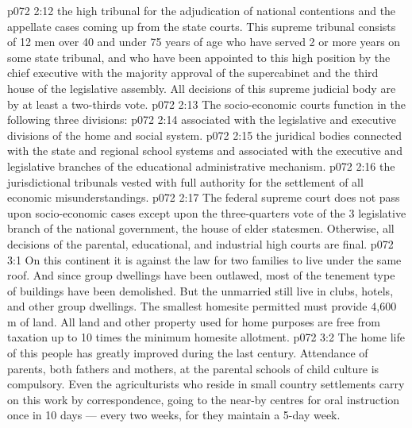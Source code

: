 \vs p072 2:12 \bibnobreakspace {} the high tribunal for the adjudication of national contentions and the appellate cases coming up from the state courts. This supreme tribunal consists of 12 men over 40 and under 75 years of age who have served 2 or more years on some state tribunal, and who have been appointed to this high position by the chief executive with the majority approval of the supercabinet and the third house of the legislative assembly. All decisions of this supreme judicial body are by at least a two\hyp{}thirds vote.
\vs p072 2:13 \pc The socio\hyp{}economic courts function in the following three divisions:
\vs p072 2:14 \bibnobreakspace {} associated with the legislative and executive divisions of the home and social system.
\vs p072 2:15 \bibnobreakspace {} the juridical bodies connected with the state and regional school systems and associated with the executive and legislative branches of the educational administrative mechanism.
\vs p072 2:16 \bibnobreakspace {} the jurisdictional tribunals vested with full authority for the settlement of all economic misunderstandings.
\vs p072 2:17 \pc The federal supreme court does not pass upon socio\hyp{}economic cases except upon the three\hyp{}quarters vote of the 3 legislative branch of the national government, the house of elder statesmen. Otherwise, all decisions of the parental, educational, and industrial high courts are final.
\vs p072 3:1 On this continent it is against the law for two families to live under the same roof. And since group dwellings have been outlawed, most of the tenement type of buildings have been demolished. But the unmarried still live in clubs, hotels, and other group dwellings. The smallest homesite permitted must provide 4,600\,m of land. All land and other property used for home purposes are free from taxation up to 10 times the minimum homesite allotment.
\vs p072 3:2 The home life of this people has greatly improved during the last century. Attendance of parents, both fathers and mothers, at the parental schools of child culture is compulsory. Even the agriculturists who reside in small country settlements carry on this work by correspondence, going to the near\hyp{}by centres for oral instruction once in 10 days --- every two weeks, for they maintain a 5\hyp{}day week.
